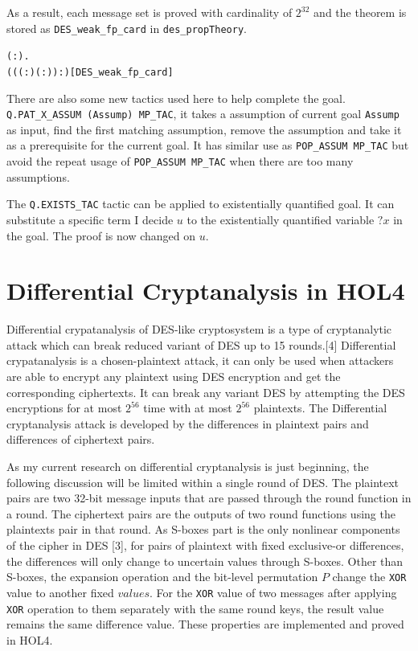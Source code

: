 \documentclass{article}
\begin{document}
As a result, each message set is proved with cardinality of $2^{32}$ and the theorem is stored as
\verb|DES_weak_fp_card| in \verb|des_propTheory|.

\begin{alltt}
\HOLTokenTurnstile{} \HOLSymConst{\HOLTokenForall{}}( : \HOLTokenMap{} ).
        \HOLSymConst{\HOLTokenImp{}}   \HOLSymConst{=} ((( :) \HOLSymConst{\HOLTokenExp{}} ( :)) :)\hfill{[DES_weak_fp_card]}
\end{alltt}

There are also some new tactics used here to help complete the goal. \\
\verb|Q.PAT_X_ASSUM (Assump) MP_TAC|, it takes a
assumption of current goal \verb|Assump| as input, find the first matching assumption, remove the assumption and take it
as a prerequisite for the current goal. It has similar use as \verb|POP_ASSUM MP_TAC| but avoid the repeat usage
of \verb|POP_ASSUM MP_TAC| when there are too many assumptions.

The \verb|Q.EXISTS_TAC| tactic can be applied to existentially quantified goal. It can substitute a specific term I decide $u$
to the existentially quantified variable $?x$ in the goal. The proof is now changed on $u$.

\section{Differential Cryptanalysis in HOL4}
Differential crypatanalysis of DES-like cryptosystem is a type of cryptanalytic attack which can break reduced variant
of DES up to 15 rounds.[4] Differential crypatanalysis is a chosen-plaintext attack, it can only be used when attackers
are able to encrypt any plaintext using DES encryption and get the corresponding ciphertexts. It can break any variant DES
by attempting the DES encryptions for at most $2^{56}$ time with at most $2^{56}$ plaintexts. The Differential cryptanalysis
attack is developed by the differences in plaintext pairs and differences of ciphertext pairs.

As my current research on differential cryptanalysis is just beginning, the following discussion will be limited within
a single round of DES. The plaintext pairs are two 32-bit message inputs that are passed through the round function
in a round. The ciphertext pairs are the outputs of two round functions using the plaintexts pair in that round.
As S-boxes part is the only nonlinear components of the cipher in DES [3], for pairs of plaintext with fixed
exclusive-or differences, the differences will only change to uncertain values through S-boxes. Other than S-boxes,
the expansion operation and the bit-level permutation $P$ change the \verb|XOR| value to another fixed $values$. For the \verb|XOR| value
of two messages after applying \verb|XOR| operation to them separately with the same round keys, the result value remains the same
difference value. These properties are implemented and proved in HOL4.
\end{document}
